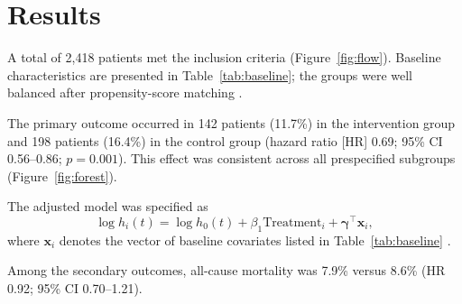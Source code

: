 \section{Results}
\label{sec:results}

A total of 2,418 patients met the inclusion criteria (Figure~\ref{fig:flow}). Baseline characteristics are presented in Table~\ref{tab:baseline}; the groups were well balanced after propensity-score matching \cite{austin2011introduction}.

The primary outcome occurred in 142 patients (11.7\%) in the intervention group and 198 patients (16.4\%) in the control group (hazard ratio [HR] 0.69; 95\% CI 0.56--0.86; $p = 0.001$). This effect was consistent across all prespecified subgroups (Figure~\ref{fig:forest}).

The adjusted model was specified as
\begin{equation}
  \log h_i(t) = \log h_0(t) + \beta_1 \text{Treatment}_i + \boldsymbol{\gamma}^\top \mathbf{x}_i ,
  \label{eq:cox}
\end{equation}
where $\mathbf{x}_i$ denotes the vector of baseline covariates listed in Table~\ref{tab:baseline} \cite{cox1972regression, therneau2000modeling}.

Among the secondary outcomes, all-cause mortality was 7.9\% versus 8.6\% (HR 0.92; 95\% CI 0.70--1.21).
